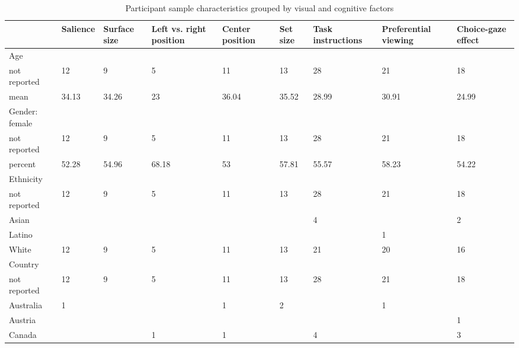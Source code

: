 \begin{table}[ht]
\centering
\caption{Participant sample characteristics grouped by visual and cognitive factors} 
\label{tab:sampleTable}
\begingroup\small
\begin{tabular}{lp{.07\linewidth}p{.07\linewidth}p{.09\linewidth}p{.09\linewidth}p{.07\linewidth}p{.08\linewidth}p{.1\linewidth}p{.07\linewidth}}
  \hline
  & Salience & Surface size & Left vs. right position & Center position & Set size & Task instructions & Preferential viewing & Choice-gaze effect \\ 
  \hline
Age &  &  &  &  &  &  &  &  \\ 
  \hspace{2mm}not reported & 12 & 9 & 5 & 11 & 13 & 28 & 21 & 18 \\ 
  \hspace{2mm}mean & 34.13 & 34.26 & 23 & 36.04 & 35.52 & 28.99 & 30.91 & 24.99 \\ 
  Gender: female &  &  &  &  &  &  &  &  \\ 
  \hspace{2mm}not reported & 12 & 9 & 5 & 11 & 13 & 28 & 21 & 18 \\ 
  \hspace{2mm}percent & 52.28 & 54.96 & 68.18 & 53 & 57.81 & 55.57 & 58.23 & 54.22 \\ 
  Ethnicity &  &  &  &  &  &  &  &  \\ 
  \hspace{2mm}not reported & 12 & 9 & 5 & 11 & 13 & 28 & 21 & 18 \\ 
  \hspace{2mm}Asian &  &  &  &  &  & 4 &  & 2 \\ 
  \hspace{2mm}Latino &  &  &  &  &  &  & 1 &  \\ 
  \hspace{2mm}White & 12 & 9 & 5 & 11 & 13 & 21 & 20 & 16 \\ 
  Country &  &  &  &  &  &  &  &  \\ 
  \hspace{2mm}not reported & 12 & 9 & 5 & 11 & 13 & 28 & 21 & 18 \\ 
  \hspace{2mm}Australia & 1 &  &  & 1 & 2 &  & 1 &  \\ 
  \hspace{2mm}Austria &  &  &  &  &  &  &  & 1 \\ 
  \hspace{2mm}Canada &  &  & 1 & 1 &  & 4 &  & 3 \\ 

\end{tabular}
\end{table}
